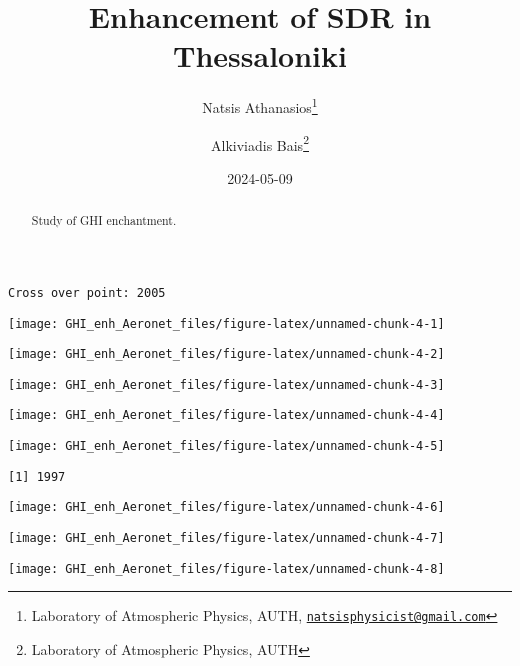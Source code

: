 \documentclass[
  10pt,
  a4paper,oneside]{article}
\title{Enhancement of SDR in Thessaloniki}
\author{Natsis Athanasios\footnote{Laboratory of Atmospheric Physics, AUTH, \href{mailto:natsisphysicist@gmail.com}{\nolinkurl{natsisphysicist@gmail.com}}} \and Alkiviadis Bais\footnote{Laboratory of Atmospheric Physics, AUTH}}
\date{2024-05-09}
\begin{document}
\maketitle
\begin{abstract}
Study of GHI enchantment.
\end{abstract}

{
\hypersetup{linkcolor=}
\setcounter{tocdepth}{4}
\tableofcontents
}
\begin{verbatim}
Cross over point: 2005 
\end{verbatim}

\begin{center}\texttt{[image: GHI\_enh\_Aeronet\_files/figure-latex/unnamed-chunk-4-1]} \end{center}

\begin{center}\texttt{[image: GHI\_enh\_Aeronet\_files/figure-latex/unnamed-chunk-4-2]} \end{center}

\begin{center}\texttt{[image: GHI\_enh\_Aeronet\_files/figure-latex/unnamed-chunk-4-3]} \end{center}

\begin{center}\texttt{[image: GHI\_enh\_Aeronet\_files/figure-latex/unnamed-chunk-4-4]} \end{center}

\begin{center}\texttt{[image: GHI\_enh\_Aeronet\_files/figure-latex/unnamed-chunk-4-5]} \end{center}

\begin{verbatim}
[1] 1997
\end{verbatim}

\begin{center}\texttt{[image: GHI\_enh\_Aeronet\_files/figure-latex/unnamed-chunk-4-6]} \end{center}

\begin{center}\texttt{[image: GHI\_enh\_Aeronet\_files/figure-latex/unnamed-chunk-4-7]} \end{center}

\begin{center}\texttt{[image: GHI\_enh\_Aeronet\_files/figure-latex/unnamed-chunk-4-8]} \end{center}
\end{document}
